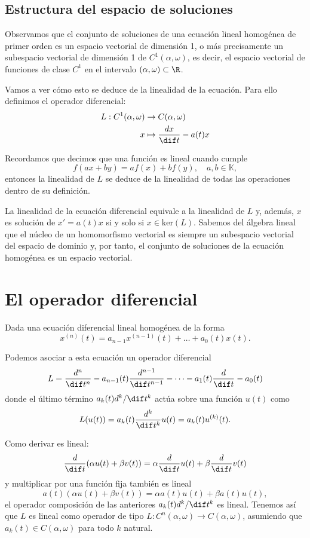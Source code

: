 \documentclass[../main.tex]{subfiles}
\begin{document}
\subsection{Estructura del espacio de soluciones}

Observamos que el conjunto de soluciones de una ecuación lineal homogénea de
primer orden es un espacio vectorial de dimensión 1, o más precisamente un
subespacio vectorial de dimensión 1 de \(C^1(\alpha, \omega)\), es decir, el
espacio vectorial de funciones de clase \(C^1\) en el intervalo
\((\alpha, \omega) \subset \R\).

Vamos a ver cómo esto se deduce de la linealidad de la ecuación. Para ello
definimos el operador diferencial:
\begin{align*}
  L : C^1(\alpha, \omega) &\to C(\alpha, \omega) \\
  x &\mapsto \frac{d x}{\dif t} - a(t)x
\end{align*}

Recordamos que decimos que una función es lineal cuando cumple
\[f(ax + by) = af(x) + bf(y), \quad a, b \in \mathbb{K},\]
entonces la linealidad de \(L\) se deduce de la linealidad de todas las
operaciones dentro de su definición.

\begin{remark}
La linealidad de la ecuación diferencial equivale a la linealidad de
\(L\) y, además, \(x\) es solución de \(x' = a(t)x\) si y solo si
\(x \in \text{ker}(L)\). Sabemos del álgebra lineal que el núcleo de un
homomorfismo vectorial es siempre un subespacio vectorial del espacio de dominio
y, por tanto, el conjunto de soluciones de la ecuación homogénea es un espacio
vectorial.
\end{remark}

\section{El operador diferencial}

Dada una ecuación diferencial lineal homogénea de la forma
\[x^{(n)}(t) = a_{n-1}x^{(n - 1)}(t) + \dots + a_0(t)x(t).\]

Podemos asociar a esta ecuación un operador diferencial
\[L = \frac{d^n}{\dif t^n} - a_{n-1}(t)\frac{d^{n-1}}{\dif t^{n-1}}
	- \dots - a_1(t)\frac{d}{\dif t} - a_0(t)\]
donde el último término \(a_k(t) d^k/\dif t^k\) actúa sobre una 
función \(u(t)\) como
\[L(u(t)) = a_k(t) \frac{d^k}{\dif t^k} u(t) = a_k(t) u^{(k)}(t).\]

Como derivar es lineal:
\[\frac{d}{\dif t} (\alpha u(t) + \beta v(t)) 
	= \alpha \frac{d}{\dif t} u(t) + \beta \frac{d}{\dif t} v(t)\]
y multiplicar por una función fija también es lineal
\[a(t)(\alpha u(t) + \beta v(t)) = \alpha a(t) u(t) + \beta a(t) u(t),\]
el operador composición de las anteriores \(a_k(t) d^k/\dif t^k\) es
lineal. Tenemos así que \(L\) es lineal como operador de tipo
\(L : C^n(\alpha, \omega) \to C(\alpha, \omega)\), asumiendo que
\(a_k(t) \in C(\alpha, \omega)\) para todo \(k\) natural.
\end{document}
